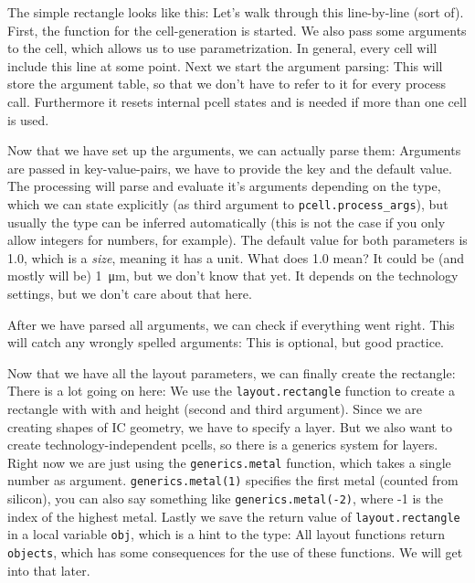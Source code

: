 The simple rectangle looks like this:
Let's walk through this line-by-line (sort of). First, the function for the cell-generation is started. We also pass some arguments to the cell, which allows us to
use parametrization.
In general, every cell will include this line at some point. Next we start the argument parsing:
This will store the argument table, so that we don't have to refer to it for every process call. Furthermore it resets internal pcell states and is needed if more
than one cell is used.

Now that we have set up the arguments, we can actually parse them:
Arguments are passed in key-value-pairs, we have to provide the key and the default value. The processing will parse and evaluate it's arguments depending on the
type, which we can state explicitly (as third argument to \lstinline!pcell.process_args!), but usually the type can be inferred automatically (this is not the case
if you only allow integers for numbers, for example). The default value for both parameters is 1.0, which is a \emph{size}, meaning it has a unit. What does 1.0
mean? It could be (and mostly will be) \SI{1}{\micro\meter}, but we don't know that yet. It depends on the technology settings, but we don't care about that here.

After we have parsed all arguments, we can check if everything went right. This will catch any wrongly spelled arguments: 
This is optional, but good practice.

Now that we have all the layout parameters, we can finally create the rectangle:
There is a lot going on here: We use the \lstinline!layout.rectangle! function to create a rectangle with with and height (second and third argument). Since we are
creating shapes of IC geometry, we have to specify a layer. But we also want to create technology-independent pcells, so there is a generics system for layers. Right
now we are just using the \lstinline!generics.metal! function, which takes a single number as argument. \lstinline!generics.metal(1)! specifies the first metal
(counted from silicon), you can also say something like \lstinline!generics.metal(-2)!, where -1 is the index of the highest metal. Lastly we save the return value
of \lstinline!layout.rectangle! in a local variable \lstinline!obj!, which is a hint to the type: All layout functions return \lstinline!objects!, which has some
consequences for the use of these functions. We will get into that later.

